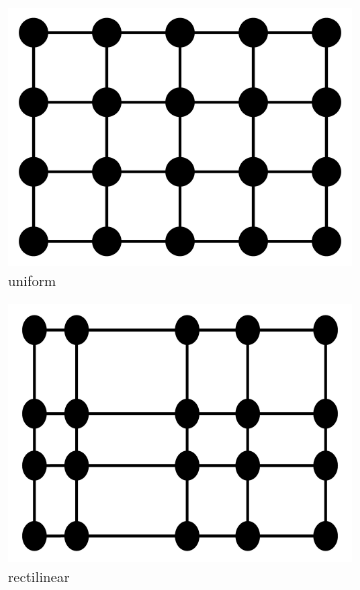 \begin{figure}
\begin{subfigure}[b]{0.2\textwidth}
    \includegraphics[clip=true, width=\textwidth]{Images/Uniform.pdf}
    \caption{uniform}
    \label{fig:uniform}
  \end{subfigure}
  \begin{subfigure}[b]{0.2\textwidth}
    \includegraphics[clip=true, width=\textwidth]{Images/Rectilinear.pdf}
    \caption{rectilinear}
    \label{fig:rectilinear}
  \end{subfigure}
  \begin{subfigure}[b]{0.19\textwidth}

\end{subfigure}
\end{figure}
